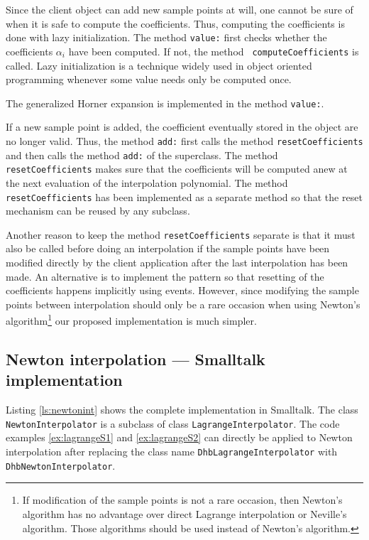 \documentclass[twoside]{book}
\begin{document}
Since the client object can add new sample points at will, one
cannot be sure of when it is safe to compute the coefficients.
Thus, computing the coefficients is done with lazy initialization.
The method {\tt value:} first checks whether the coefficients
$\alpha_i$ have been computed. If not, the method {\tt
computeCoefficients} is called. Lazy initialization is a technique
widely used in object oriented programming whenever some value
needs only be computed once.

\noindent The generalized Horner expansion is implemented in the
method {\tt value:}.

If a new sample point is added, the coefficient eventually stored
in the object are no longer valid. Thus, the method {\tt add:}
first calls the method {\tt resetCoefficients} and then calls the
method {\tt add:} of the superclass. The method {\tt
resetCoefficients} makes sure that the coefficients will be
computed anew at the next evaluation of the interpolation
polynomial. The method {\tt resetCoefficients} has been
implemented as a separate method so that the reset mechanism can
be reused by any subclass.

Another reason to keep the method {\tt resetCoefficients} separate
is that it must also be called before doing an interpolation if
the sample points have been modified directly by the client
application after the last interpolation has been made. An
alternative is to implement the 
pattern so that resetting of the coefficients happens implicitly
using events. However, since modifying the sample points between
interpolation should only be a rare occasion when using Newton's
algorithm\footnote{If modification of the sample points is not a
rare occasion, then Newton's algorithm has no advantage over
direct Lagrange interpolation or Neville's algorithm. Those
algorithms should be used instead of Newton's algorithm.} our
proposed implementation is much simpler.

\subsection{Newton interpolation --- Smalltalk implementation}
Listing \ref{ls:newtonint} shows the complete implementation in
Smalltalk. The class {\tt NewtonInterpolator} is a subclass of
class {\tt LagrangeInterpolator}. The code examples
\ref{ex:lagrangeS1} and \ref{ex:lagrangeS2} can directly be
applied to Newton interpolation after replacing the class name
{\tt DhbLagrangeInterpolator} with {\tt DhbNewtonInterpolator}.
\end{document}

